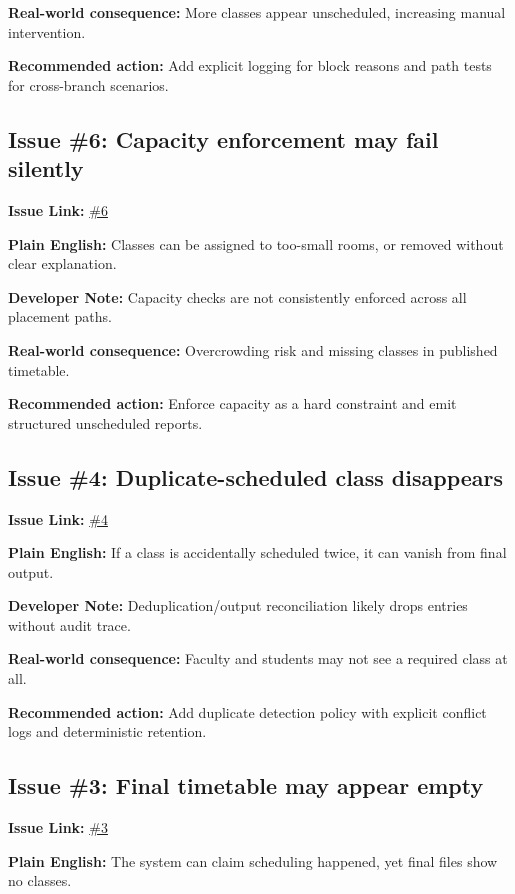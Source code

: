 \documentclass[12pt,a4paper]{article}
\begin{document}
\textbf{Real-world consequence:} More classes appear unscheduled, increasing manual intervention.

\textbf{Recommended action:} Add explicit logging for block reasons and path tests for cross-branch scenarios.

\subsection*{Issue \#6: Capacity enforcement may fail silently}
\textbf{Issue Link:} \href{https://github.com/ArnavBallinCode/TimetableIIITDWD/issues/6}{\#6}

\textbf{Plain English:} Classes can be assigned to too-small rooms, or removed without clear explanation.

\textbf{Developer Note:} Capacity checks are not consistently enforced across all placement paths.

\textbf{Real-world consequence:} Overcrowding risk and missing classes in published timetable.

\textbf{Recommended action:} Enforce capacity as a hard constraint and emit structured unscheduled reports.

\subsection*{Issue \#4: Duplicate-scheduled class disappears}
\textbf{Issue Link:} \href{https://github.com/ArnavBallinCode/TimetableIIITDWD/issues/4}{\#4}

\textbf{Plain English:} If a class is accidentally scheduled twice, it can vanish from final output.

\textbf{Developer Note:} Deduplication/output reconciliation likely drops entries without audit trace.

\textbf{Real-world consequence:} Faculty and students may not see a required class at all.

\textbf{Recommended action:} Add duplicate detection policy with explicit conflict logs and deterministic retention.

\subsection*{Issue \#3: Final timetable may appear empty}
\textbf{Issue Link:} \href{https://github.com/ArnavBallinCode/TimetableIIITDWD/issues/3}{\#3}

\textbf{Plain English:} The system can claim scheduling happened, yet final files show no classes.
\end{document}

